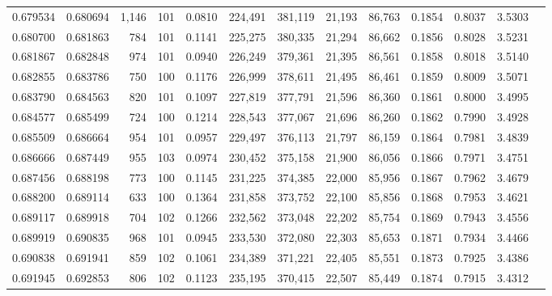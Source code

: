 \begin{tabular}{rrrrrrrrrrrrr}
0.679534 & 0.680694 & 1,146 & 101 &                                     0.0810 & 224,491 & 381,119 &  21,193 &  86,763 & 0.1854 & 0.8037 & 3.5303 \\
0.680700 & 0.681863 &   784 & 101 &                                     0.1141 & 225,275 & 380,335 &  21,294 &  86,662 & 0.1856 & 0.8028 & 3.5231 \\
0.681867 & 0.682848 &   974 & 101 &                                     0.0940 & 226,249 & 379,361 &  21,395 &  86,561 & 0.1858 & 0.8018 & 3.5140 \\
0.682855 & 0.683786 &   750 & 100 &                                     0.1176 & 226,999 & 378,611 &  21,495 &  86,461 & 0.1859 & 0.8009 & 3.5071 \\
0.683790 & 0.684563 &   820 & 101 &                                     0.1097 & 227,819 & 377,791 &  21,596 &  86,360 & 0.1861 & 0.8000 & 3.4995 \\
0.684577 & 0.685499 &   724 & 100 &                                     0.1214 & 228,543 & 377,067 &  21,696 &  86,260 & 0.1862 & 0.7990 & 3.4928 \\
0.685509 & 0.686664 &   954 & 101 &                                     0.0957 & 229,497 & 376,113 &  21,797 &  86,159 & 0.1864 & 0.7981 & 3.4839 \\
0.686666 & 0.687449 &   955 & 103 &                                     0.0974 & 230,452 & 375,158 &  21,900 &  86,056 & 0.1866 & 0.7971 & 3.4751 \\
0.687456 & 0.688198 &   773 & 100 &                                     0.1145 & 231,225 & 374,385 &  22,000 &  85,956 & 0.1867 & 0.7962 & 3.4679 \\
0.688200 & 0.689114 &   633 & 100 &                                     0.1364 & 231,858 & 373,752 &  22,100 &  85,856 & 0.1868 & 0.7953 & 3.4621 \\
0.689117 & 0.689918 &   704 & 102 &                                     0.1266 & 232,562 & 373,048 &  22,202 &  85,754 & 0.1869 & 0.7943 & 3.4556 \\
0.689919 & 0.690835 &   968 & 101 &                                     0.0945 & 233,530 & 372,080 &  22,303 &  85,653 & 0.1871 & 0.7934 & 3.4466 \\
0.690838 & 0.691941 &   859 & 102 &                                     0.1061 & 234,389 & 371,221 &  22,405 &  85,551 & 0.1873 & 0.7925 & 3.4386 \\
0.691945 & 0.692853 &   806 & 102 &                                     0.1123 & 235,195 & 370,415 &  22,507 &  85,449 & 0.1874 & 0.7915 & 3.4312 \\

\end{tabular}
